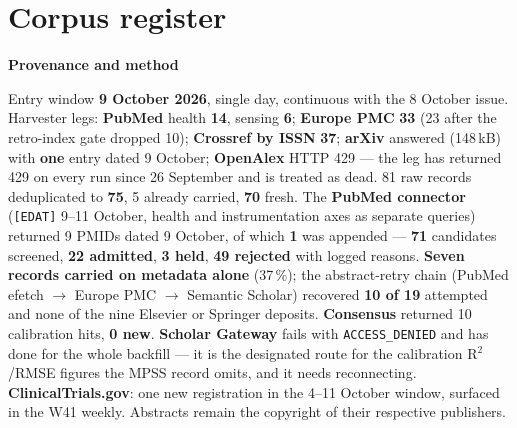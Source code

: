 \documentclass[10pt]{article}
\begin{document}
\clearpage
\section*{\sffamily\bfseries\color{Deep}Corpus register}
\vspace{-1.5mm}{\color{Amber}\rule{\linewidth}{1.1pt}}\vspace{2.5mm}



\vspace{2mm}

\begin{keybox}
{\sffamily\bfseries\footnotesize\color{Deep}Provenance and method}\\[1.2mm]
{\fontsize{7.2}{8.8}\selectfont
Entry window \textbf{9 October 2026}, single day, continuous with the 8 October issue.
Harvester legs: \textbf{PubMed} health \textbf{14}, sensing \textbf{6}; \textbf{Europe PMC} \textbf{33}
(23 after the retro-index gate dropped 10); \textbf{Crossref by ISSN} \textbf{37}; \textbf{arXiv}
answered (148\,kB) with \textbf{one} entry dated 9 October; \textbf{OpenAlex} HTTP 429 --- the leg has
returned 429 on every run since 26 September and is treated as dead. 81 raw records deduplicated to
\textbf{75}, 5 already carried, \textbf{70} fresh. The \textbf{PubMed connector} (\texttt{[EDAT]}
9--11 October, health and instrumentation axes as separate queries) returned 9 PMIDs dated 9 October, of
which \textbf{1} was appended --- \textbf{71} candidates screened, \textbf{22 admitted}, \textbf{3 held},
\textbf{49 rejected} with logged reasons. \textbf{Seven records carried on metadata alone} (37\,\%); the
abstract-retry chain (PubMed efetch $\to$ Europe PMC $\to$ Semantic Scholar) recovered \textbf{10 of 19}
attempted and none of the nine Elsevier or Springer deposits. \textbf{Consensus} returned 10 calibration
hits, \textbf{0 new}. \textbf{Scholar Gateway} fails with \texttt{ACCESS\_DENIED} and has done for the
whole backfill --- it is the designated route for the calibration R$^2$/RMSE figures the MPSS record
omits, and it needs reconnecting. \textbf{ClinicalTrials.gov}: one new registration in the 4--11 October
window, surfaced in the W41 weekly. Abstracts remain the copyright of their respective publishers.\par}
\end{keybox}
\end{document}
